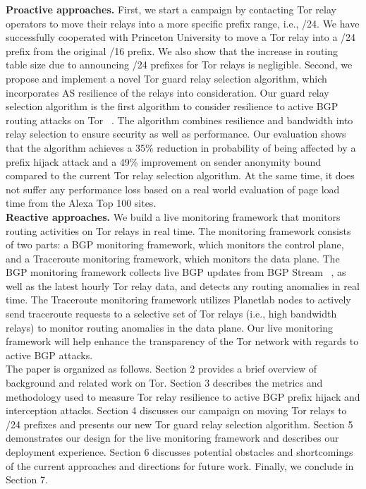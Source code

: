 \textbf{Proactive approaches.} First, we start a campaign by contacting Tor relay operators to move their relays into a more specific prefix range, i.e., /24. We have successfully cooperated with Princeton University to move a Tor relay into a /24 prefix from the original /16 prefix. We also show that the increase in routing table size due to announcing /24 prefixes for Tor relays is negligible. Second, we propose and implement a novel Tor guard relay selection algorithm, which incorporates AS resilience of the relays into consideration. Our guard relay selection algorithm is the first algorithm to consider resilience to active BGP routing attacks on Tor ~\cite{sun2015raptor}. The algorithm combines resilience and bandwidth into relay selection to ensure security as well as performance. Our evaluation shows that the algorithm achieves a 35\% reduction in probability of being affected by a prefix hijack attack and a 49\% improvement on sender anonymity bound compared to the current Tor relay selection algorithm. At the same time, it does not suffer any performance loss based on a real world evaluation of page load time from the Alexa Top 100 sites. 
\\
\textbf{Reactive approaches.} We build a live monitoring framework that monitors routing activities on Tor relays in real time. The monitoring framework consists of two parts: a BGP monitoring framework, which monitors the control plane, and a Traceroute monitoring framework, which monitors the data plane. The BGP monitoring framework collects live BGP updates from BGP Stream ~\cite{bgpstream}, as well as the latest hourly Tor relay data, and detects any routing anomalies in real time. The Traceroute monitoring framework utilizes Planetlab nodes to actively send traceroute requests to a selective set of Tor relays (i.e., high bandwidth relays) to monitor routing anomalies in the data plane. Our live monitoring framework will help enhance the transparency of the Tor network with regards to active BGP attacks.
\\
The paper is organized as follows. Section 2 provides a brief overview of background and related work on Tor.  Section 3 describes the metrics and methodology used to measure Tor relay resilience to active BGP prefix hijack and interception attacks. Section 4 discusses our campaign on moving Tor relays to /24 prefixes and presents our new Tor guard relay selection algorithm. Section 5 demonstrates our design for the live monitoring framework and describes our deployment experience. Section 6 discusses potential obstacles and shortcomings of the current approaches and directions for future work. Finally, we conclude in Section 7. 
